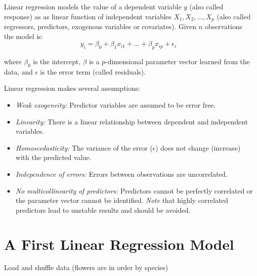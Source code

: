\documentclass[
  notitlepage]{book}
\newenvironment{Shaded}{\begin{snugshade}}{\end{snugshade}}
\newcommand{\CommentTok}[1]{\textcolor[rgb]{0.56,0.35,0.01}{\textit{#1}}}
\newcommand{\DataTypeTok}[1]{\textcolor[rgb]{0.13,0.29,0.53}{#1}}
\newcommand{\DecValTok}[1]{\textcolor[rgb]{0.00,0.00,0.81}{#1}}
\newcommand{\KeywordTok}[1]{\textcolor[rgb]{0.13,0.29,0.53}{\textbf{#1}}}
\newcommand{\NormalTok}[1]{#1}
\newcommand{\OperatorTok}[1]{\textcolor[rgb]{0.81,0.36,0.00}{\textbf{#1}}}
\newcommand{\StringTok}[1]{\textcolor[rgb]{0.31,0.60,0.02}{#1}}
\providecommand{\tightlist}{%
  \setlength{\itemsep}{0pt}\setlength{\parskip}{0pt}}
\begin{document}
Linear regression models the value of a dependent variable \(y\) (also called
response) as
as linear function of independent variables \(X_1, X_2, ..., X_p\)
(also called regressors, predictors, exogenous variables or covariates).
Given \(n\) observations the model is:
\[y_i = \beta_0 + \beta_1 x_{i1} + \dots + \beta_p x_{ip} + \epsilon_i \]

where \(\beta_0\) is the intercept, \(\beta\) is a \(p\)-dimensional parameter
vector learned from the data, and \(\epsilon\) is the error term
(called residuals).

Linear regression makes several assumptions:

\begin{itemize}
\tightlist
\item
  \emph{Weak exogeneity:} Predictor variables are assumed to be error free.
\item
  \emph{Linearity:} There is a linear relationship between dependent
  and independent variables.
\item
  \emph{Homoscedasticity:} The variance of the error (\(\epsilon\))
  does not change (increase) with the predicted value.
\item
  \emph{Independence of errors:} Errors between observations are uncorrelated.
\item
  \emph{No multicollinearity of predictors:} Predictors cannot be
  perfectly correlated or the parameter vector cannot be identified. \emph{Note}
  that highly correlated predictors lead to unstable results and should be
  avoided.
\end{itemize}

\hypertarget{a-first-linear-regression-model}{%
\section{A First Linear Regression Model}\label{a-first-linear-regression-model}}

Load and shuffle data (flowers are in order by species)

\begin{Shaded}
\end{Shaded}
\end{document}
